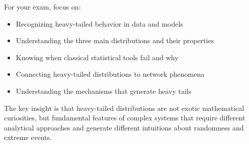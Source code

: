 \documentclass[11pt]{article}
\begin{document}
For your exam, focus on:
\begin{itemize}
\item Recognizing heavy-tailed behavior in data and models
\item Understanding the three main distributions and their properties
\item Knowing when classical statistical tools fail and why
\item Connecting heavy-tailed distributions to network phenomena
\item Understanding the mechanisms that generate heavy tails
\end{itemize}

The key insight is that heavy-tailed distributions are not exotic mathematical curiosities, but fundamental features of complex systems that require different analytical approaches and generate different intuitions about randomness and extreme events.
\end{document}
